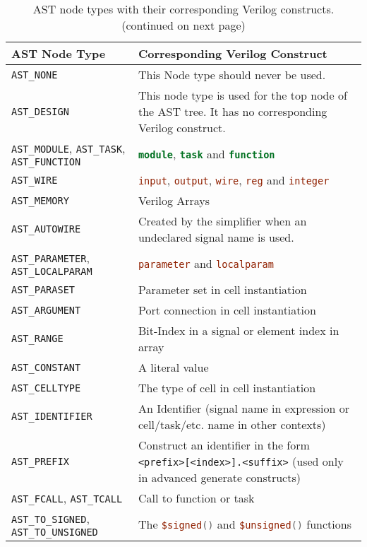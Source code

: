 \begin{table}[b!]
\hfil
\begin{tabular}{>{\raggedright\arraybackslash}p{7cm}>{\raggedright\arraybackslash}p{8cm}}
AST Node Type & Corresponding Verilog Construct \\
\hline
\hline
\arrayrulecolor{gray}
{\tt AST\_NONE} & This Node type should never be used. \\
\hline
%
{\tt AST\_DESIGN} & This node type is used for the top node of the AST tree. It
has no corresponding Verilog construct. \\
\hline
%
{\tt AST\_MODULE},
{\tt AST\_TASK},
{\tt AST\_FUNCTION} &
\lstinline[language=Verilog];module;,
\lstinline[language=Verilog];task; and
\lstinline[language=Verilog];function; \\
\hline
%
{\tt AST\_WIRE} &
\lstinline[language=Verilog];input;,
\lstinline[language=Verilog];output;,
\lstinline[language=Verilog];wire;,
\lstinline[language=Verilog];reg; and
\lstinline[language=Verilog];integer; \\
\hline
%
{\tt AST\_MEMORY}  &
Verilog Arrays \\
\hline
%
{\tt AST\_AUTOWIRE} &
Created by the simplifier when an undeclared signal name is used. \\
\hline
%
{\tt AST\_PARAMETER},
{\tt AST\_LOCALPARAM} &
\lstinline[language=Verilog];parameter; and
\lstinline[language=Verilog];localparam; \\
\hline
%
{\tt AST\_PARASET} &
Parameter set in cell instantiation \\
\hline
%
{\tt AST\_ARGUMENT} &
Port connection in cell instantiation \\
\hline
%
{\tt AST\_RANGE} &
Bit-Index in a signal or element index in array \\
\hline
%
{\tt AST\_CONSTANT} &
A literal value \\
\hline
%
{\tt AST\_CELLTYPE} &
The type of cell in cell instantiation \\
\hline
%
{\tt AST\_IDENTIFIER} &
An Identifier (signal name in expression or cell/task/etc. name in other contexts) \\
\hline
%
{\tt AST\_PREFIX} &
Construct an identifier in the form {\tt <prefix>[<index>].<suffix>} (used only in
advanced generate constructs) \\
\hline
%
{\tt AST\_FCALL},
{\tt AST\_TCALL} &
Call to function or task \\
\hline
%
{\tt AST\_TO\_SIGNED},
{\tt AST\_TO\_UNSIGNED} &
The \lstinline[language=Verilog];$signed(); and
\lstinline[language=Verilog];$unsigned(); functions \\
\hline
\end{tabular}
\caption{AST node types with their corresponding Verilog constructs. \\ (continued on next page)}
\label{tab:Verilog_AstNodeType}
\end{table}

